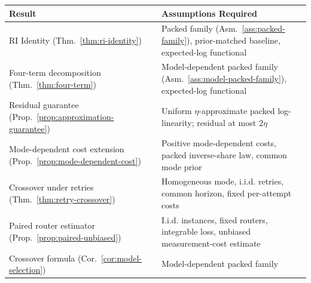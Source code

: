 \documentclass[10pt,twocolumn]{article}
\theoremstyle{paperplain}
\theoremstyle{paperdefinition}
\theoremstyle{paperremark}
\begin{document}
\begin{center}
\small
\renewcommand{\arraystretch}{1.2}
\begin{tabular}{@{}lp{7cm}@{}}
\toprule
\textbf{Result} & \textbf{Assumptions Required} \\
\midrule
RI Identity (Thm.~\ref{thm:ri-identity}) & Packed family (Asm.~\ref{ass:packed-family}), prior-matched baseline, expected-log functional \\
Four-term decomposition (Thm.~\ref{thm:four-term}) & Model-dependent packed family (Asm.~\ref{ass:model-packed-family}), expected-log functional \\
Residual guarantee (Prop.~\ref{prop:approximation-guarantee}) & Uniform $\eta$-approximate packed log-linearity; residual at most $2\eta$ \\
Mode-dependent cost extension (Prop.~\ref{prop:mode-dependent-cost}) & Positive mode-dependent costs, packed inverse-share law, common mode prior \\
Crossover under retries (Thm.~\ref{thm:retry-crossover}) & Homogeneous mode, i.i.d. retries, common horizon, fixed per-attempt costs \\
Paired router estimator (Prop.~\ref{prop:paired-unbiased}) & I.i.d. instances, fixed routers, integrable loss, unbiased measurement-cost estimate \\
Crossover formula (Cor.~\ref{cor:model-selection}) & Model-dependent packed family \\
\bottomrule
\end{tabular}
\end{center}
\end{document}
